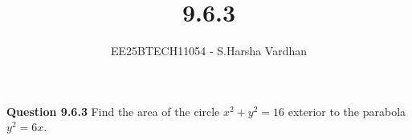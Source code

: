 \documentclass[journal]{IEEEtran}
\begin{document}


\title{9.6.3}
\author{EE25BTECH11054 - S.Harsha Vardhan}
\maketitle 
\renewcommand{\thefigure}{\theenumi}
\renewcommand{\thetable}{\theenumi}
\setlength{\intextsep}{10pt} %

\renewcommand{\thetable}{\theenumi}
\vspace{-1em}
\textbf{Question 9.6.3}
Find the area of the circle $x^2 + y^2 = 16$ exterior to the parabola $y^2 = 6x$.
\end{document}
